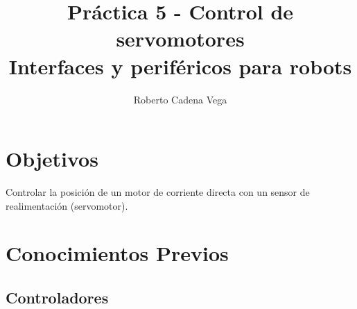 
\title{Práctica 5 - Control de servomotores\\Interfaces y periféricos para robots}
\author{Roberto Cadena Vega} %
\date{}

\maketitle %
\section{Objetivos}

	Controlar la posición de un motor de corriente directa con un sensor de realimentación (servomotor).
\section{Conocimientos Previos}
	\subsection{Controladores}



